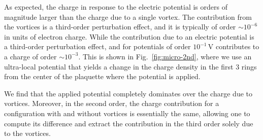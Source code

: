 As expected, the charge in response to the electric potential is orders of magnitude larger than the charge due to a single vortex.
The contribution from the vortices is a third-order perturbation effect, and it is typically of order $\sim 10^{-6} $ in units of electron charge.
While the contribution due to an electric potential is a third-order perturbation effect, and for potentials of order $10^{-1} \, \mathrm{V}$ contributes to a charge of order $\sim 10^{-3}$. This is shown in Fig.~\ref{fig:micro-2nd}, where we use an ultra-local potential that yields a change in the charge density in the first $3$ rings from the center of the plaquette where the potential is applied.

We find that the applied potential completely dominates over the charge due to vortices. Moreover, in the second order, the charge contribution for a configuration with and without vortices is essentially the same, allowing one to compute its difference and extract the contribution in the third order solely due to the vortices.




